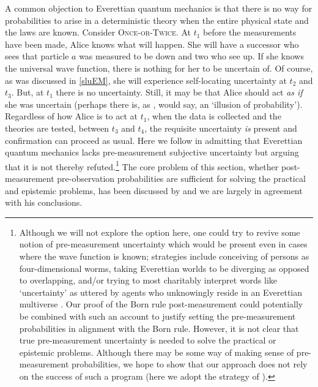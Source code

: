 \documentclass[onecolumn,secnumarabic,amsmath,amssymb,balancelastpage,nofootinbib]{article}
\begin{document}
A common objection to Everettian quantum mechanics is that there is no way for probabilities to arise in a deterministic theory when the entire physical state and the laws are known.  Consider \textsc{Once-or-Twice}.  At $t_1$ before the measurements have been made, Alice knows what will happen.  She will have a successor who sees that particle $a$ was measured to be down and two who see up.  If she knows the universal wave function, there is nothing for her to be uncertain of.  Of course, as was discussed in \textsection \ref{sluEM}, she will experience self-locating uncertainty at $t_2$ and $t_3$.  But, at $t_1$ there is no uncertainty.  Still, it may be that Alice should act \textit{as if} she was uncertain (perhaps there is, as \citeauthor{vaidman2011} \citeyear{vaidman2011}, \citeyear{vaidman2014} would say, an `illusion of probability').  Regardless of how Alice is to act at $t_1$, when the data is collected and the theories are tested, between $t_3$ and $t_4$, the requisite uncertainty \emph{is} present and confirmation can proceed as usual.  Here we follow \citet{greaves2004} in admitting that Everettian quantum mechanics lacks pre-measurement subjective uncertainty but arguing that it is not thereby refuted.\footnote{Although we will not explore the option here, one could try to revive some notion of pre-measurement uncertainty which would be present even in cases where the wave function is known; strategies include conceiving of persons as four-dimensional worms, taking Everettian worlds to be diverging as opposed to overlapping, and/or trying to most charitably interpret words like `uncertainty' as uttered by agents who unknowingly reside in an Everettian multiverse \citep[see][ch. 7]{saunders2008,saunders2010b,wilson2012b,wallace2012}.  Our proof of the Born rule post-measurement could  potentially be combined with such an account to justify setting the pre-measurement probabilities in alignment with the Born rule.  However, it is not clear that true pre-measurement uncertainty is needed to solve the practical or epistemic problems.  Although there may be some way of making sense of pre-measurement probabilities, we hope to show that our approach does not rely on the success of such a program (here we adopt the strategy of \citealp[]{greaves2007b}).\label{pbuncertainty}}  The core problem of this section, whether post-measurement pre-observation probabilities are sufficient for solving the practical and epistemic problems, has been discussed by \citet{tappenden2011} and we are largely in agreement with his conclusions.
\end{document}

